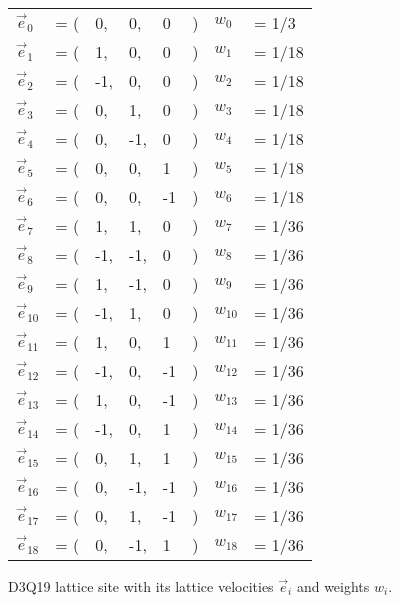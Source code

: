 \begin{figure}[!ht]
\centering
\begin{scriptsize}
\def\svgwidth{0.5\linewidth}

\end{scriptsize}
\qquad
\begin{scriptsize}
{\setlength{\tabcolsep}{0.1em}
\begin{tabular}[b]{ p{0.4cm} p{0.5cm} R{0.4cm} R{0.4cm} R{0.4cm} R{0.1cm} R{1cm} p{1cm} }
$\vec{e}_{0}$ &= (&0,&0,&0&) & $w_{0}$ &= 1/3\\
$\vec{e}_{1}$ &= (&1,&0,&0&) & $w_{1}$ &= 1/18\\
$\vec{e}_{2}$ &= (&-1,&0,&0&) & $w_{2}$ &= 1/18\\
$\vec{e}_{3}$ &= (&0,&1,&0&) & $w_{3}$ &= 1/18\\
$\vec{e}_{4}$ &= (&0,&-1,&0&) & $w_{4}$ &= 1/18\\
$\vec{e}_{5}$ &= (&0,&0,&1&) & $w_{5}$ &= 1/18\\
$\vec{e}_{6}$ &= (&0,&0,&-1&) & $w_{6}$ &= 1/18\\
$\vec{e}_{7}$ &= (&1,&1,&0&) & $w_{7}$ &= 1/36\\
$\vec{e}_{8}$ &= (&-1,&-1,&0&) & $w_{8}$ &= 1/36\\
$\vec{e}_{9}$ &= (&1,&-1,&0&) & $w_{9}$ &= 1/36\\
$\vec{e}_{10}$ &= (&-1,&1,&0&) & $w_{10}$ &= 1/36\\
$\vec{e}_{11}$ &= (&1,&0,&1&) & $w_{11}$ &= 1/36\\
$\vec{e}_{12}$ &= (&-1,&0,&-1&) & $w_{12}$ &= 1/36\\
$\vec{e}_{13}$ &= (&1,&0,&-1&) & $w_{13}$ &= 1/36\\
$\vec{e}_{14}$ &= (&-1,&0,&1&) & $w_{14}$ &= 1/36\\
$\vec{e}_{15}$ &= (&0,&1,&1&) & $w_{15}$ &= 1/36\\
$\vec{e}_{16}$ &= (&0,&-1,&-1&) & $w_{16}$ &= 1/36\\
$\vec{e}_{17}$ &= (&0,&1,&-1&) & $w_{17}$ &= 1/36\\
$\vec{e}_{18}$ &= (&0,&-1,&1&) & $w_{18}$ &= 1/36
\end{tabular}}
\end{scriptsize}
\captionsetup{labelformat=andtable}
\caption{D3Q19 lattice site with its lattice velocities $\vec{e}_i$ and weights $w_i$.}
\label{fig:d3q19}
\end{figure}

